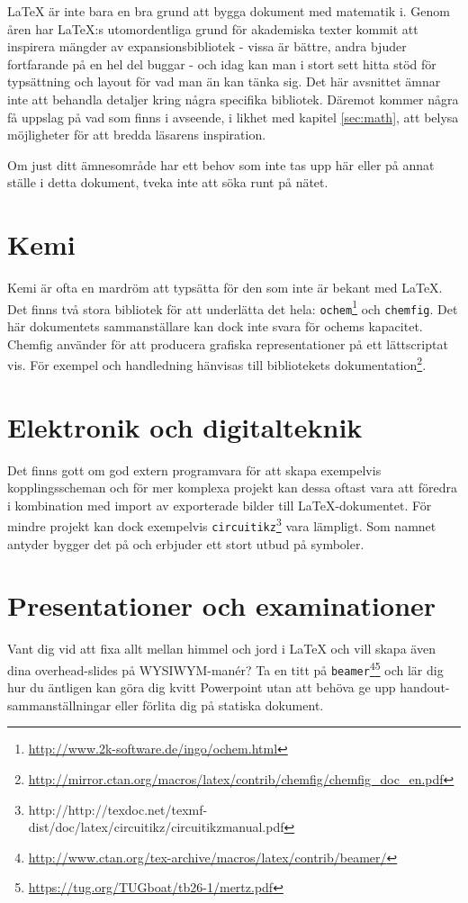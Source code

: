 \LaTeX{} är inte bara en bra grund att bygga dokument med matematik i. Genom åren har \LaTeX{}:s utomordentliga grund för akademiska texter kommit att inspirera mängder av expansionsbibliotek - vissa är bättre, andra bjuder fortfarande på en hel del buggar - och idag kan man i stort sett hitta stöd för typsättning och layout för vad man än kan tänka sig. Det här avsnittet ämnar inte att behandla detaljer kring några specifika bibliotek. Däremot kommer några få uppslag på vad som finns i avseende, i likhet med kapitel \ref{sec:math}, att belysa möjligheter för att bredda läsarens inspiration.

Om just ditt ämnesområde har ett behov som inte tas upp här eller på annat ställe i detta dokument, tveka inte att söka runt på nätet.

\section{Kemi}
Kemi är ofta en mardröm att typsätta för den som inte är bekant med \LaTeX{}. Det finns två stora bibliotek för att underlätta det hela: \verb?ochem?\footnote{\url{http://www.2k-software.de/ingo/ochem.html}} och \verb?chemfig?. Det här dokumentets sammanställare kan dock inte svara för ochems kapacitet. Chemfig använder \TikZ{} för att producera grafiska representationer på ett lättscriptat vis. För exempel och handledning hänvisas till bibliotekets dokumentation\footnote{\url{http://mirror.ctan.org/macros/latex/contrib/chemfig/chemfig_doc_en.pdf}}.

\section{Elektronik och digitalteknik}
Det finns gott om god extern programvara för att skapa exempelvis kopplingsscheman och för mer komplexa projekt kan dessa oftast vara att föredra i kombination med import av exporterade bilder till \LaTeX{}-dokumentet. För mindre projekt kan dock exempelvis \verb?circuitikz?\footnote{http://http://texdoc.net/texmf-dist/doc/latex/circuitikz/circuitikzmanual.pdf} vara lämpligt. Som namnet antyder bygger det på \TikZ{} och erbjuder ett stort utbud på symboler.

\section{Presentationer och examinationer}
Vant dig vid att fixa allt mellan himmel och jord i \LaTeX{} och vill skapa även dina overhead-slides på WYSIWYM-manér? Ta en titt på \verb?beamer?\footnote{\url{http://www.ctan.org/tex-archive/macros/latex/contrib/beamer/}}\footnote{\url{https://tug.org/TUGboat/tb26-1/mertz.pdf}} och lär dig hur du äntligen kan göra dig kvitt Powerpoint utan att behöva ge upp handout-sammanställningar eller förlita dig på statiska dokument.

